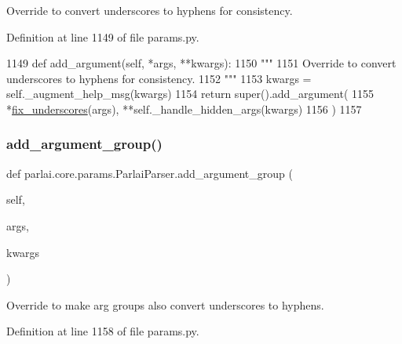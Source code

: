 \begin{DoxyVerb}Override to convert underscores to hyphens for consistency.
\end{DoxyVerb}
 

Definition at line 1149 of file params.\+py.


\begin{DoxyCode}
1149     \textcolor{keyword}{def }add\_argument(self, *args, **kwargs):
1150         \textcolor{stringliteral}{"""}
1151 \textcolor{stringliteral}{        Override to convert underscores to hyphens for consistency.}
1152 \textcolor{stringliteral}{        """}
1153         kwargs = self.\_augment\_help\_msg(kwargs)
1154         \textcolor{keywordflow}{return} super().add\_argument(
1155             *\hyperlink{namespaceparlai_1_1core_1_1params_afe2837a1dc21017be30cc7e3cb3696b8}{fix\_underscores}(args), **self.\_handle\_hidden\_args(kwargs)
1156         )
1157 
\end{DoxyCode}
\mbox{\label{classparlai_1_1core_1_1params_1_1ParlaiParser_a2855a5676bf638bfc9491577e603eee3}} 
\subsubsection{\texorpdfstring{add\+\_\+argument\+\_\+group()}{add\_argument\_group()}}
{\footnotesize\ttfamily def parlai.\+core.\+params.\+Parlai\+Parser.\+add\+\_\+argument\+\_\+group (\begin{DoxyParamCaption}\item[{}]{self,  }\item[{}]{args,  }\item[{}]{kwargs }\end{DoxyParamCaption})}

\begin{DoxyVerb}Override to make arg groups also convert underscores to hyphens.
\end{DoxyVerb}
 

Definition at line 1158 of file params.\+py.



